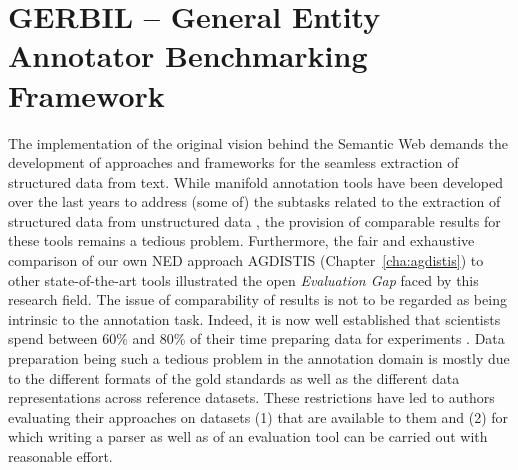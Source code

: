 \chapter{GERBIL -- General Entity Annotator Benchmarking Framework}

\label{cha:gerbil}

The implementation of the original vision behind the Semantic Web demands the development of approaches and frameworks for the seamless extraction of structured data from text. 
While manifold annotation tools have been developed over the last years to address (some of) the subtasks related to the extraction of structured data from unstructured data \cite{TagMe2,AIDA,spotlight,milne2008learning,babelfy,piccinno2014tagme,rizzo2014,Steinmetz2013,agdistis_iswc}, the provision of comparable results for these tools remains a tedious problem.
Furthermore, the fair and exhaustive comparison of our own \ac{NED} approach AGDISTIS (Chapter~\ref{cha:agdistis}) to other state-of-the-art tools illustrated the open \emph{Evaluation Gap} faced by this research field.
The issue of  comparability of results is not to be regarded as being intrinsic to the annotation task. Indeed, it is now well established that scientists spend between 60\% and 80\% of their time preparing data for experiments \cite{GIL2014,jermyn1999preparing,peng2011reproducible}. Data preparation being such a tedious problem in the annotation domain is mostly due to the different formats of the gold standards as well as the different data representations across reference datasets.
These restrictions have led to authors evaluating their approaches on datasets (1) that are available to them and (2) for which writing a parser as well as of an evaluation tool can be carried out with reasonable effort.

